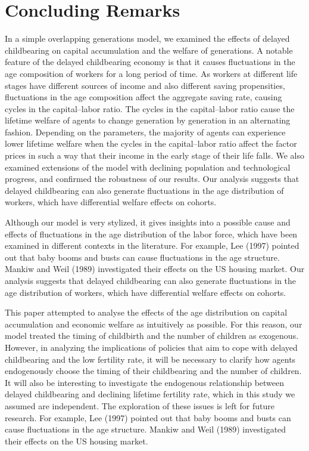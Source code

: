 \documentclass{MBE}%
\begin{document}
{\section{Concluding Remarks\label{sec:Conclusion}}

In a simple overlapping generations model, we examined the effects of delayed childbearing on
capital accumulation and the welfare of generations. A notable feature of the delayed childbearing
economy is that it causes fluctuations in the age composition of workers for a long period of
time. As workers at different life stages have different sources of income and also different
saving propensities, fluctuations in the age composition affect the aggregate saving rate, causing
cycles in the capital--labor ratio. The cycles in the capital--labor ratio cause the lifetime
welfare of agents to change generation by generation in an alternating fashion. Depending on the
parameters, the majority of agents can experience lower lifetime welfare when the cycles in the
capital--labor ratio affect the factor prices in such a way that their income in the early stage
of their life falls. We also examined extensions of the model with declining population and
technological progress, and confirmed the robustness of our results. Our analysis suggests that
delayed childbearing can also generate fluctuations in the age distribution of workers, which have
differential welfare effects on cohorts.

Although our model is very stylized, it gives insights into a possible cause
and effects of fluctuations in the age distribution of the labor force, which
have been examined in different contexts in the literature. For example, Lee
(1997) pointed out that baby booms and busts can cause fluctuations in the age
structure. Mankiw and Weil (1989) investigated their effects on the US housing
market. Our analysis suggests that delayed childbearing can also generate
fluctuations in the age distribution of workers, which have differential
welfare effects on cohorts.

This paper attempted to analyse the effects of the age distribution on capital accumulation and
economic welfare as intuitively as possible. For this reason, our model treated the timing of
childbirth and the number of children as exogenous. However, in analyzing the implications of
policies that aim to cope with delayed childbearing and the low fertility rate, it will be
necessary to clarify how agents endogenously choose the timing of their childbearing and the
number of children. It will also be interesting to investigate the endogenous relationship between
delayed childbearing and declining lifetime fertility rate, which in this study we assumed are
independent. The exploration of these issues is left for future research. For example, Lee (1997)
pointed out that baby booms and busts can cause fluctuations in the age structure. Mankiw and Weil
(1989) investigated their effects on the US housing market.


}
\end{document}
